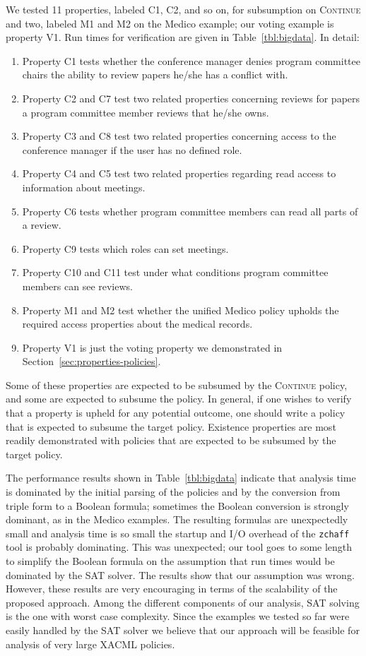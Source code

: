 We tested 11 properties, labeled C1, C2, and so on, for subsumption on
\textsc{Continue} and two, labeled M1 and M2 on the Medico example;
our voting example is property V1.  Run times for verification are
given in Table~\ref{tbl:bigdata}.  In detail:
\begin{enumerate}
\item Property C1 tests whether the conference manager denies program
  committee chairs the ability to review papers he/she has a conflict
  with.
\item Property C2 and C7 test two related properties concerning
  reviews for papers a program committee member reviews that he/she
  owns.
\item Property C3 and C8 test two related properties concerning access
  to the conference manager if the user has no defined role.
\item Property C4 and C5 test two related properties regarding read
  access to information about meetings.
\item Property C6 tests whether program committee members can read
  all parts of a review.
\item Property C9 tests which roles can set meetings.
\item Property C10 and C11 test under what conditions program
  committee members can see reviews.
\item Property M1 and M2 test whether the unified Medico policy
  upholds the required access properties about the medical records.
\item Property V1 is just the voting property we demonstrated in
  Section~\ref{sec:properties-policies}.
\end{enumerate}
Some of these properties are expected to be subsumed by the
\textsc{Continue} policy, and some are expected to subsume the policy.
In general, if one wishes to verify that a property is upheld for any
potential outcome, one should write a policy that is expected to
subsume the target policy.  Existence properties are most readily
demonstrated with policies that are expected to be subsumed by the
target policy.

The performance results shown in Table~\ref{tbl:bigdata} indicate that
analysis time is dominated by the initial parsing of the policies and
by the conversion from triple form to a Boolean formula; sometimes the
Boolean conversion is strongly dominant, as in the Medico examples.
The resulting formulas are unexpectedly small and analysis time is so
small the startup and I/O overhead of the \texttt{zchaff} tool is
probably dominating.  This was unexpected; our tool goes to some
length to simplify the Boolean formula on the assumption that run
times would be dominated by the SAT solver.  The results show that our
assumption was wrong.  However, these results are very encouraging in
terms of the scalability of the proposed approach.  Among the
different components of our analysis, SAT solving is the one with
worst case complexity.  Since the examples we tested so far were
easily handled by the SAT solver we believe that our approach will be
feasible for analysis of very large XACML policies.

